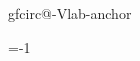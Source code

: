 {{        %
        \expandafter\xdef\csname pgfcirc@\pgfcirc@a@prefix-Vlab-anchor\endcsname{\pgf@circ@bipole@voltage@label@anchor}
        \ifpgf@circuit@bipole@voltage@below
            \def\pgf@circ@bipole@voltage@label@where{-90}
        \else
            \def\pgf@circ@bipole@voltage@label@where{90}
        \fi

        \ifnum {}=-1
            \ifpgf@circuit@bipole@voltage@below
                \pgf@circuit@bipole@voltage@belowfalse
            \else
                \pgf@circuit@bipole@voltage@belowtrue
            \fi
        \fi

        \ifpgf@circuit@bipole@inverted
            \ifpgf@circuit@bipole@voltage@below
                \pgf@circuit@bipole@voltage@belowfalse
            \else
                \pgf@circuit@bipole@voltage@belowtrue
            \fi
        \fi

        \setscaledRlenforclass

}}
